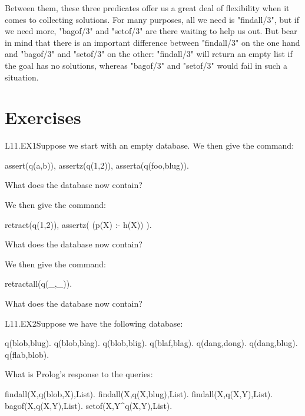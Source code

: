 Between them, these three predicates offer us a great deal of
flexibility when it comes to collecting solutions.  For many purposes,
all we need is "findall/3", but if we need more, "bagof/3" and
"setof/3" are there waiting to help us out.  But bear in mind that
there is an important difference between "findall/3" on the one hand
and "bagof/3" and "setof/3" on the other: "findall/3" will return an
empty list if the goal has no solutions, whereas "bagof/3" and
"setof/3" would fail in such a situation.


\section{Exercises}\label{SEC.L11.EXERCISES}

\begin{LPNexercise}{L11.EX1}Suppose we start with an empty database.
We then give the command:
\begin{LPNcodedisplay}
assert(q(a,b)), assertz(q(1,2)), asserta(q(foo,blug)).
\end{LPNcodedisplay}
What does the database now contain?

We then give the command:
\begin{LPNcodedisplay}
retract(q(1,2)), assertz( (p(X) :-  h(X)) ).
\end{LPNcodedisplay}
What does the database now contain?

We then give the command:
\begin{LPNcodedisplay}
retractall(q(_,_)).
\end{LPNcodedisplay}
What  does the database now contain?
\end{LPNexercise}


\begin{LPNexercise}{L11.EX2}Suppose we have the following database:
\begin{LPNcodedisplay}
q(blob,blug).
q(blob,blag).
q(blob,blig).
q(blaf,blag).
q(dang,dong).
q(dang,blug).
q(flab,blob).
\end{LPNcodedisplay}

What is Prolog's response to the queries:
\begin{LPNcodedisplay}
findall(X,q(blob,X),List).
findall(X,q(X,blug),List).
findall(X,q(X,Y),List).
bagof(X,q(X,Y),List).
setof(X,Y^q(X,Y),List).
\end{LPNcodedisplay}
\end{LPNexercise}


